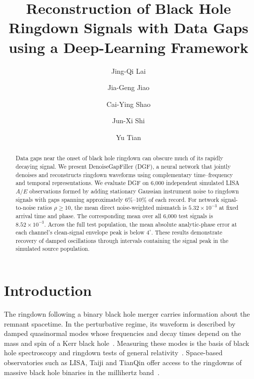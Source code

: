 \documentclass[10pt,prd,aps,a4paper,twocolumn,superscriptaddress,nofootinbib,floatfix]{revtex4-2}
\begin{document}
\title{Reconstruction of Black Hole Ringdown Signals with Data Gaps using a Deep-Learning Framework}
\author{Jing-Qi Lai}
\author{Jia-Geng Jiao}
\author{Cai-Ying Shao}

\author{Jun-Xi Shi}
\author{Yu Tian}

\begin{abstract}
Data gaps near the onset of black hole ringdown can obscure much of its rapidly decaying signal. We present DenoiseGapFiller (DGF), a neural network that jointly denoises and reconstructs ringdown waveforms using complementary time--frequency and temporal representations. We evaluate DGF on 6,000 independent simulated LISA $A/E$ observations formed by adding stationary Gaussian instrument noise to ringdown signals with gaps spanning approximately 6\%--10\% of each record. For network signal-to-noise ratios $\rho\ge10$, the mean direct noise-weighted mismatch is $5.32\times10^{-3}$ at fixed arrival time and phase. The corresponding mean over all 6,000 test signals is $8.52\times10^{-3}$. Across the full test population, the mean absolute analytic-phase error at each channel's clean-signal envelope peak is below $4^\circ$. These results demonstrate recovery of damped oscillations through intervals containing the signal peak in the simulated source population.
\end{abstract}

\maketitle
\section{Introduction}
The ringdown following a binary black hole merger carries information about the remnant spacetime. In the perturbative regime, its waveform is described by damped quasinormal modes whose frequencies and decay times depend on the mass and spin of a Kerr black hole~\cite{berti2006gravitational,berti2009qnm}. Measuring these modes is the basis of black hole spectroscopy and ringdown tests of general relativity~\cite{Isi_2019}. Space-based observatories such as LISA, Taiji and TianQin offer access to the ringdowns of massive black hole binaries in the millihertz band~\cite{amaroseoane2017laserinterferometerspaceantenna,robson2019construction,Ruan2020,Luo2016}.
\end{document}
